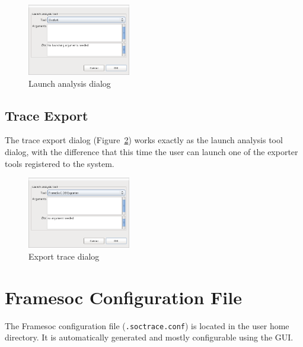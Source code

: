 \documentclass[twoside]{article}
\begin{document}
\begin{sloppypar}
\begin{figure}[h!]
  \centering
    \includegraphics[width=0.4\textwidth]{images/analysis_dialog.png}
  \caption{Launch analysis dialog}
  \label{fig:analysis_dialog}
\end{figure}

\subsection{Trace Export }
\label{subsec:export}

The  trace export dialog (Figure~\ref{fig:export_dialog}) works exactly as the launch analysis tool dialog, with the difference that this time the user can launch one of the exporter tools registered to the system.

\begin{figure}[h!]
  \centering
    \includegraphics[width=0.4\textwidth]{images/export_dialog.png}
  \caption{Export trace dialog}
  \label{fig:export_dialog}
\end{figure}

\newpage

\appendix

\section{Framesoc Configuration File}
\label{app:conf}

The Framesoc configuration file (\texttt{.soctrace.conf}) is located in the user home directory.
It is automatically generated and mostly configurable using the GUI.


\end{sloppypar}
\end{document}
